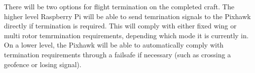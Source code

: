 There will be two options for flight termination on the completed craft. The higher level Raspberry Pi will be able to send temrination signals to the Pixhawk directly if termination is required. This will comply with either fixed wing or multi rotor temrmination requirements, depending which mode it is currently in. On a lower level, the Pixhawk will be able to automatically comply with termination requirements through a failsafe if necessary (such as crossing a geofence or losing signal). 